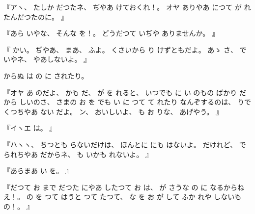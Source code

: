 %
『アヽ、
%
たしか
だつたネ、
%
ぢやあ
けておくれ！。
%
オヤ
ありやあ
につて
が
れたんだつたのに。
』

%
『あら
いやな、
%
そんな
を！。
%
どうだつて
いぢや
ありませんか。
』

%
『
かい。
%
ぢやあ、
%
まあ、
%
ふよ。
%
くさいから
り
けずともだよ。
%
あゝ
さ、
%
で
いやネ、
%
やあしないよ。
』

%
からぬ
は
の
に
されたり。

%
『オヤ
あ
のだよ、
かも
だ、
%
が
を
れると、
%
いつでも
に
い
のもの
ばかり
だから
しいのさ、
%
さまの
お
を
でも
い
に
つて
て
れたり
なんぞするのは、
%
りで
くつちやあ
ない
だよ。
%
ン、
%
おいしいよ、
%
も
お
りな、
%
あげやう。
』

%
『イヽエ
は。
』

%
『ハヽヽ、
%
ちつとも
らないだけは、
%
ほんとに
にも
はないよ。
%
だけれど、
%
で
られちやあ
だからネ、
%
も
いかも
れないよ。
』

%
『あらまあ
い
を。
』

%
『だつて
お
まで
だつた
にやあ
したつて
お
は、
%
が
さうな
の
に
なるからねえ！。
%
の
を
つて
はうと
つて
たつて、
%
な
を%
お
が
して
ふか
れや
しないもの！。
』

